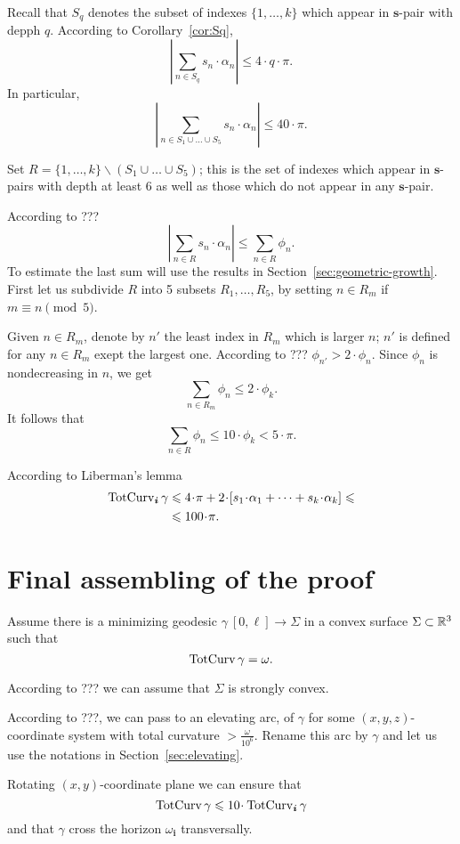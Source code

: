 \documentclass[a4paper,10pt]{amsart}
\begin{document}
Recall that $S_q$ denotes the subset of indexes $\{1,\dots,k\}$
which appear in $\bm{s}$-pair with depph $q$.
According to Corollary~\ref{cor:Sq},
\[\left|\sum_{n\in S_q}s_n\cdot\alpha_n\right|\le 4\cdot q\cdot \pi.\]
In particular,
\[\left|\sum_{n\in S_1\cup\dots\cup S_5}
s_n\cdot\alpha_n\right|
\le 
40\cdot\pi.\]

Set $R=\{1,\dots,k\}\backslash (S_1\cup\dots\cup S_5)$;
this is the set of indexes which appear in $\bm{s}$-pairs with depth at least $6$ 
as well as those which do not appear in any $\bm{s}$-pair.

According to ???
\[\left|\sum_{n\in R}
s_n\cdot\alpha_n\right|\le \sum_{n\in R}\phi_n.\] 
To estimate the last sum will use the results in Section~\ref{sec:geometric-growth}.
First let us subdivide $R$ into 5 subsets $R_1,\dots,R_5$,
by setting 
$n\in R_m$ if $m\equiv n\pmod 5$.

Given $n\in R_m$, denote by $n'$ the least index in $R_m$ which is larger $n$;
$n'$ is defined for any $n\in R_m$ exept the largest one.
According to ??? $\phi_{n'}>2\cdot \phi_n$.
Since $\phi_n$ is nondecreasing in $n$,
we get 
\[\sum_{n\in R_m}\phi_n\le 2\cdot\phi_k.\]
It follows that 
\[\sum_{n\in R}\phi_n\le 10\cdot\phi_k< 5\cdot\pi.\]

According to Liberman's lemma
\begin{align*}
\tc_{\bm{i}}\gamma
&\le 
4\cdot\pi
+
2\cdot [s_1\cdot\alpha_1+\dots+s_k\cdot\alpha_k]\le 
\\
&\le 100\cdot \pi.
\end{align*}
\qeds



\section{Final assembling of the proof}


Assume there is a minimizing geodesic $\gamma\:[0,\ell]\to \Sigma$ in a convex surface $\Sigma\subset \mathbb{R}^3$ such that
\[\mathop{\rm TotCurv}\nolimits\gamma=\omega.\]

According to ??? we can assume that $\Sigma$ is strongly convex.

According to ???, we can pass to an elevating arc, of $\gamma$ for some $(x,y,z)$-coordinate system with total curvature $>\tfrac{\omega}{10^6}$.
Rename this arc by $\gamma$ and let us use the notations in Section~\ref{sec:elevating}.

Rotating $(x,y)$-coordinate plane we can ensure that
\[\tc\gamma\le 10\cdot\tc_{\bm{i}}\gamma\]
and that $\gamma$ cross the horizon $\omega_{\bm{i}}$ transversally.
\end{document}
